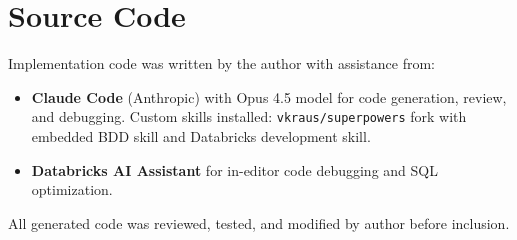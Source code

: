 \section*{Source Code}

Implementation code was written by the author with assistance from:

\begin{itemize}
    \item \textbf{Claude Code} (Anthropic) with Opus 4.5 model for code generation, review, and debugging. Custom skills installed: \texttt{vkraus/superpowers} fork with embedded BDD skill and Databricks development skill.
    \item \textbf{Databricks AI Assistant} for in-editor code debugging and SQL optimization.
\end{itemize}

All generated code was reviewed, tested, and modified by author before inclusion.
